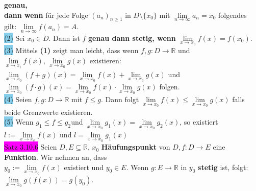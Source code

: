 \documentclass[10pt]{article}
\begin{document}
                \textbf{genau, \\
        \indent\indent dann wenn} für jede Folge \textcolor{NavyBlue}{$(a_n)_{n\geqslant1}$} 
                in \textcolor{NavyBlue}{$D\setminus\{x_0\}$} mit 
                \textcolor{NavyBlue}{$\lim\limits_{n\to\infty}a_n=x_0$} folgendes gilt: 
                \textcolor{NavyBlue}{$\lim\limits_{n\to\infty}f(a_n)=A$}. \\
        \indent \colorbox{SkyBlue}{(2)} Sei \textcolor{NavyBlue}{$x_0\in D$}. 
                Dann ist \textcolor{NavyBlue}{$f$} \textbf{genau dann stetig, 
                wenn} \textcolor{NavyBlue}{$\lim\limits_{x\to x_0}f(x)=f(x_0)$}. \\
        \indent \colorbox{SkyBlue}{(3)} Mittels \textbf{(1)} zeigt man leicht, 
                dass wenn \textcolor{NavyBlue}{$f,g:D\longrightarrow\mathbb{R}$} 
                und 
                \textcolor{NavyBlue}{$\lim\limits_{x\to x_)}f(x),\,\lim\limits_{x\to x_0}g(x)$}
                existieren: \\
        \indent\indent \textcolor{NavyBlue}{$\lim\limits_{x\to x_0}(f+g)(x)
                =\lim\limits_{x\to x_0}f(x)+\lim\limits_{x\to x_0}g(x)$} und
                \textcolor{NavyBlue}{$\lim\limits_{x\to x_0}(f\cdot g)(x)
                =\lim\limits_{x\to x_0}f(x)\cdot\lim\limits_{x\to x_0}g(x)$} folgen.\\
        \indent \colorbox{SkyBlue}{(4)} Seien
                \textcolor{NavyBlue}{$f,g:D\longrightarrow\mathbb{R}$} mit 
                \textcolor{NavyBlue}{$f\leqslant g$}. Dann folgt 
                \textcolor{NavyBlue}{
                $\lim\limits_{x\to x_0}f(x)\leqslant\lim\limits_{x\to x_0}g(x)$}
                falls beide Grenzwerte existieren. \\
        \indent \colorbox{SkyBlue}{(5)} Wenn 
                \textcolor{NavyBlue}{$g_1\leqslant f\leqslant g_2$}und 
                \textcolor{NavyBlue}{
                $\lim\limits_{x\to x_0}g_1(x)=\lim\limits_{x\to x_0}g_2(x)$}, 
                so existiert \textcolor{NavyBlue}{$l:=\lim\limits_{x\to x_0}f(x)$} und 
                \textcolor{NavyBlue}{$l=\lim\limits_{x\to x_0}g_1(x)$}\\
\colorbox{magenta}{Satz 3.10.6} Seien \textcolor{NavyBlue}{$D,E\subseteq\mathbb{R},\,x_0$} 
                \textbf{Häufungspunkt} von 
                \textcolor{NavyBlue}{$D$},\,\textcolor{NavyBlue}{$f:D\longrightarrow E$} 
                eine \textbf{Funktion}. Wir nehmen an, dass \\
        \indent \textcolor{NavyBlue}{$y_0:=\lim\limits_{x\to x_0}f(x)$} existiert und 
                \textcolor{NavyBlue}{$y_0\in E$}. Wenn 
                \textcolor{NavyBlue}{$g:E\longrightarrow\mathbb{R}$} in 
                \textcolor{NavyBlue}{$y_0$} \textbf{stetig} ist, folgt: 
                \textcolor{NavyBlue}{$\lim\limits_{x\to x_0}g(f(x))=g(y_0)$}.
\end{document}
